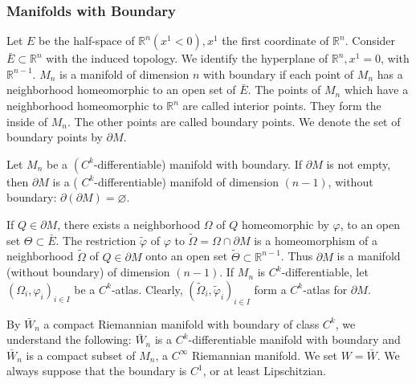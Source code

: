 \documentclass[12pt,hyperref,a4paper,UTF8]{ctexart}
\begin{document}
\subsubsection{Manifolds with Boundary}

\begin{Definition}
Let $E$ be the half-space of $\mathbb{R}^n\left(x^1<0\right), x^1$ the first coordinate of $\mathbb{R}^n$. Consider $\bar{E} \subset \mathbb{R}^n$ with the induced topology. We identify the hyperplane of $\mathbb{R}^n, x^1=0$, with $\mathbb{R}^{n-1}$.
$M_n$ is a manifold of dimension $n$ with boundary if each point of $M_n$ has a neighborhood homeomorphic to an open set of $\bar{E}$.
The points of $M_n$ which have a neighborhood homeomorphic to $\mathbb{R}^n$ are called interior points. They form the inside of $M_n$. The other points are called boundary points. We denote the set of boundary points by $\partial M$.
\end{Definition}

\begin{Theorem}
Let $M_n$ be a $\left(C^k\right.$-differentiable) manifold with boundary. If $\partial M$ is not empty, then $\partial M$ is a ( $C^k$-differentiable) manifold of dimension $(n-1)$, without boundary: $\partial(\partial M)=\varnothing$.
\label{thm51}
\end{Theorem}

\begin{Proof}
If $Q \in \partial M$, there exists a neighborhood $\Omega$ of $Q$ homeomorphic by $\varphi$, to an open set $\Theta \subset \bar{E}$. The restriction $\tilde{\varphi}$ of $\varphi$ to $\tilde{\Omega}=\Omega \cap \partial M$ is a homeomorphism of a neighborhood $\widetilde{\Omega}$ of $Q \in \partial M$ onto an open set $\widetilde{\Theta} \subset \mathbb{R}^{n-1}$. Thus $\partial M$ is a manifold (without boundary) of dimension $(n-1)$. If $M_n$ is $C^k$-differentiable, let $\left(\Omega_i, \varphi_i\right)_{i \in I}$ be a $C^k$-atlas. Clearly, $\left(\widetilde{\Omega}_i, \tilde{\varphi}_i\right)_{i \in I}$ form a $C^k$-atlas for $\partial M$.
\end{Proof}

\begin{Definition}
    By $\bar{W}_n$ a compact Riemannian manifold with boundary of class $C^k$, we understand the following: $\bar{W}_n$ is a $C^k$-differentiable manifold with boundary and $\bar{W}_n$ is a compact subset of $M_n$, a $C^{\infty}$ Riemannian manifold. We set $W=\bar{W}$. We always suppose that the boundary is $C^1$, or at least Lipschitzian.
\label{def52}
\end{Definition}
\end{document}
